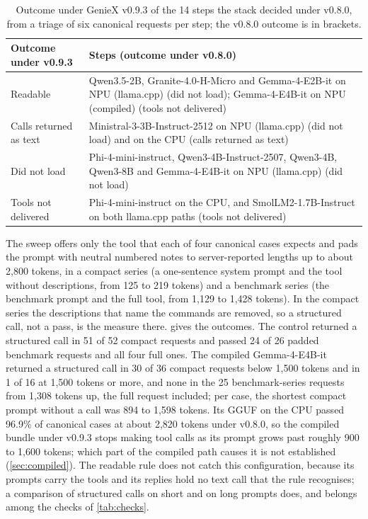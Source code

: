 \documentclass[11pt]{article}
\begin{document}
\begin{table}[tbp]
\centering
\caption{Outcome under GenieX v0.9.3 of the 14 steps the stack decided under v0.8.0, from a triage of six canonical requests per step; the v0.8.0 outcome is in brackets.}
\label{tab:triage}
\small
\begin{tabularx}{\linewidth}{@{}lL@{}}
\toprule
Outcome under v0.9.3 & Steps (outcome under v0.8.0) \\
\midrule
Readable & Qwen3.5-2B, Granite-4.0-H-Micro and Gemma-4-E2B-it on NPU (llama.cpp) (did not load); Gemma-4-E4B-it on NPU (compiled) (tools not delivered) \\
Calls returned as text & Ministral-3-3B-Instruct-2512 on NPU (llama.cpp) (did not load) and on the CPU (calls returned as text) \\
Did not load & Phi-4-mini-instruct, Qwen3-4B-Instruct-2507, Qwen3-4B, Qwen3-8B and Gemma-4-E4B-it on NPU (llama.cpp) (did not load) \\
Tools not delivered & Phi-4-mini-instruct on the CPU, and SmolLM2-1.7B-Instruct on both llama.cpp paths (tools not delivered) \\
\bottomrule
\end{tabularx}
\end{table}

The sweep offers only the tool that each of four canonical cases expects and pads the prompt with neutral numbered notes to server-reported lengths up to about 2,800 tokens, in a compact series (a one-sentence system prompt and the tool without descriptions, from 125 to 219 tokens) and a benchmark series (the benchmark prompt and the full tool, from 1,129 to 1,428 tokens). In the compact series the descriptions that name the commands are removed, so a structured call, not a pass, is the measure there.  gives the outcomes. The control returned a structured call in 51 of 52 compact requests and passed 24 of 26 padded benchmark requests and all four full ones. The compiled Gemma-4-E4B-it returned a structured call in 30 of 36 compact requests below 1,500 tokens and in 1 of 16 at 1,500 tokens or more, and none in the 25 benchmark-series requests from 1,308 tokens up, the full request included; per case, the shortest compact prompt without a call was 894 to 1,598 tokens. Its GGUF on the CPU passed 96.9\% of canonical cases at about 2,820 tokens under v0.8.0, so the compiled bundle under v0.9.3 stops making tool calls as its prompt grows past roughly 900 to 1,600 tokens; which part of the compiled path causes it is not established (\cref{sec:compiled}). The readable rule does not catch this configuration, because its prompts carry the tools and its replies hold no text call that the rule recognises; a comparison of structured calls on short and on long prompts does, and belongs among the checks of \cref{tab:checks}.
\end{document}
